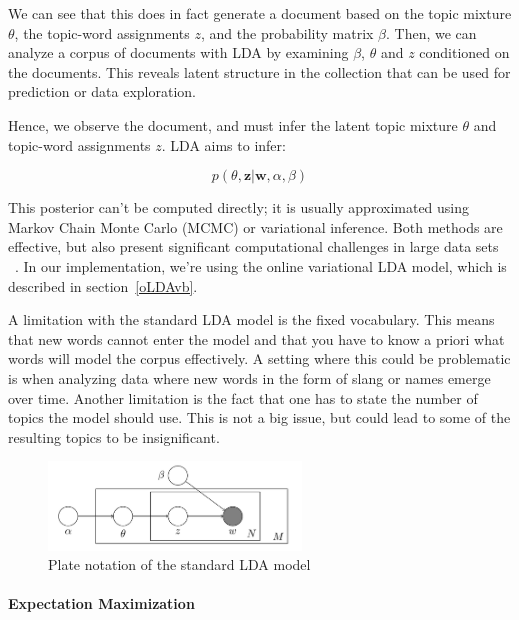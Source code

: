 \documentclass[12pt]{report}
\begin{document}
We can see that this does in fact generate a document based on the topic 
mixture $\theta$, the topic-word assignments $z$, and the probability 
matrix $\beta$. Then, we can analyze a corpus of documents with LDA by 
examining $\beta$, $\theta$ 
and $z$ conditioned on the documents. This reveals latent structure in
the collection that can be used for prediction or data exploration. 

Hence, we observe the document, and must infer the latent topic mixture 
$\theta$ and topic-word assignments $z$. LDA aims to infer:

\begin{equation}
p(\theta, \textbf{z} |\textbf{w}, \alpha, \beta)
\end{equation}

This
posterior can't be computed directly; it is usually approximated using Markov
Chain Monte Carlo (MCMC) or variational inference. Both methods are effective,
but also present significant computational challenges in large data sets
~\cite{onlineLDAvb}. In our implementation, we're using the online variational
LDA model, which is described in section~\ref{oLDAvb}.
 
A limitation with the standard LDA model is the fixed 
vocabulary. This means that new words cannot enter the model and that
you have to know a priori what words will model the corpus
effectively. A setting where this could be problematic is when
analyzing data where new words in the form of slang or names emerge
over time. Another limitation is the fact that one has to state the
number of topics the model should use. This is not a big issue, but
could lead to some of the resulting topics to be insignificant.
\begin{center}
\begin{figure}[h]
\centering
\includegraphics[width=0.6\textwidth]{figs/LDA_standard_model.png}
\caption{Plate notation of the standard LDA model}
\label{figLDA}
\end{figure}
\end{center}

\paragraph{Expectation Maximization}
\end{document}
